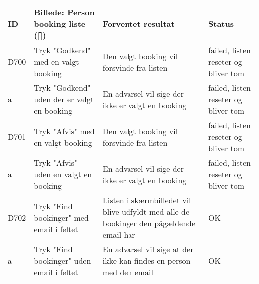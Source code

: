 \begin{longtable}{ |p{0.85cm}| p{7cm} | p{7.15cm} | p{1cm} | }
\hline
ID & Billede: Person booking liste (\ref{})   & Forventet resultat & Status\\ 
\hline
D700 & Tryk "Godkend" med en valgt booking & Den valgt booking vil forsvinde fra listen & failed, listen reseter og bliver tom \\
\hline
a & Tryk "Godkend" uden der er valgt en booking & En advarsel vil sige der ikke er valgt en booking & failed, listen reseter og bliver tom \\
\hline
D701 & Tryk "Afvis" med en valgt booking & Den valgt booking vil forsvinde fra listen & failed, listen reseter og bliver tom \\
\hline
a & Tryk "Afvis" uden en valgt en booking & En advarsel vil sige der ikke er valgt en booking & failed, listen reseter og bliver tom\\
\hline
D702 & Tryk "Find bookinger" med email i feltet & Listen i skærmbilledet vil blive udfyldt med alle de bookinger den pågældende email har & OK \\
\hline 
a & Tryk "Find bookinger" uden email i feltet & En advarsel vil sige at der ikke kan findes en person med den email & OK \\
\hline
\end{longtable}

